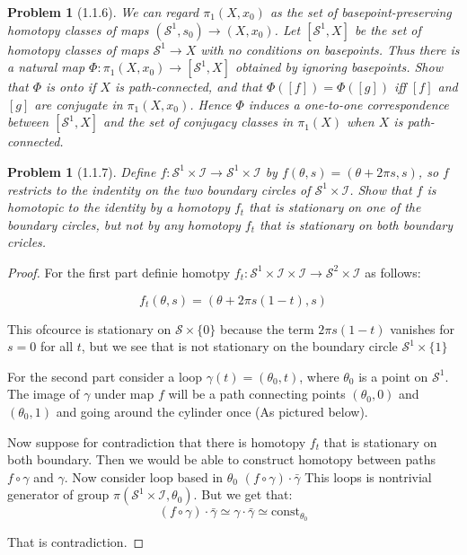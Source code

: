 \documentclass[11pt, a4paper, final]{amsart}
\newcommand{\unit}{\mathcal{I}}
\newcommand{\sphere}{\mathcal{S}}
\numberwithin{theorem}{section}
\newtheorem{problem}[theorem]{Problem}
\theoremstyle{definition}
\theoremstyle{remark}
\begin{document}
\begin{problem}[1.1.6]\label{problem: 1.1.6}
    We can regard $\pi_1(X, x_0)$ as the set of basepoint-preserving homotopy classes of maps $(\sphere^1, s_0) \rightarrow (X, x_0)$. Let $[\sphere^1, X]$ be the set of homotopy classes of maps $\sphere^1 \rightarrow X$ with no conditions on basepoints. Thus there is a natural map $\Phi : \pi_1(X, x_0) \rightarrow [\sphere^1, X]$ obtained by ignoring basepoints. Show that $\Phi$ is onto if $X$ is path-connected, and that $\Phi([f]) = \Phi([g])$ iff $[f]$ and $[g]$ are conjugate in $\pi_1(X, x_0)$. Hence $\Phi$ induces a one-to-one correspondence between $[\sphere^1, X]$ and the set of conjugacy classes in $\pi_1(X)$ when $X$ is path-connected.
\end{problem}

\begin{problem}[1.1.7]\label{problem: 1.1.7}
    Define $f:\sphere^1 \times \unit \to \sphere^1 \times \unit$ by $f(\theta, s) = (\theta + 2\pi s , s)$, so $f$
    restricts to the indentity  on the two boundary circles of $\sphere^1 \times \unit$. Show that $f$ is homotopic to 
    the identity by a homotopy $f_t$ that is stationary on one of the boundary circles, but not by any homotopy $f_t$
    that is stationary on both boundary cricles.   
\end{problem}

\begin{proof}
    For the first part definie homotpy $f_t : \sphere^1 \times \unit \times \unit \to \sphere ^2 \times \unit$ as follows:

    \begin{equation}
        f_t(\theta, s) = (\theta  + 2 \pi s (1 - t) , s)
    \end{equation}

    This ofcource is stationary on $\sphere \times \{0\}$ because the term $2 \pi s (1 - t)$ vanishes for $s = 0$ for all $t$, but
    we see that is not stationary on the boundary circle $\sphere^1 \times \{1\}$

    For the second part consider a loop $\gamma(t) = (\theta_0,t)$, where $\theta_0$ is a point on $\sphere^1$. The image of $\gamma$ under
    map $f$ will be a path connecting points $(\theta_0, 0)$ and $(\theta_0, 1)$ and going around the cylinder once (As pictured below).
    \begin{center}
        
    \end{center}

    Now suppose for contradiction that there is homotopy $f_t$ that is stationary on both boundary. Then we would be able to
    construct homotopy between paths $f \circ \gamma$ and $\gamma$. Now consider loop based in $\theta_0$ $(f \circ \gamma) \cdot \bar{\gamma}$
    This loops is nontrivial generator of group $\pi(\sphere^1 \times \unit, \theta_0)$. But we get that:
    \begin{equation}
        (f \circ \gamma) \cdot \bar{\gamma} \simeq \gamma \cdot \bar{\gamma} \simeq \text{const}_{\theta_0}
    \end{equation}

    That is contradiction.
\end{proof}
\end{document}
